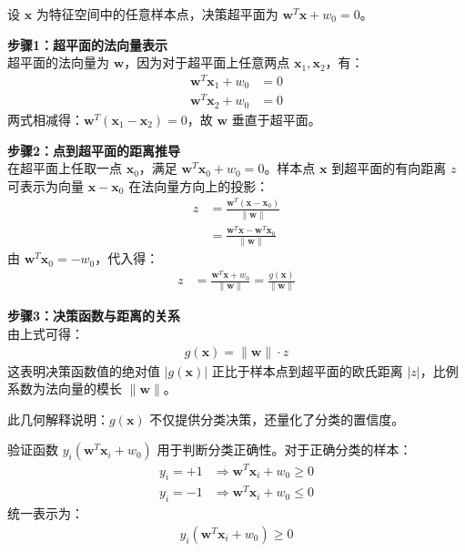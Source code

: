 \begin{derivationnote}[决策函数几何意义的详细证明]
设 $\boldsymbol{x}$ 为特征空间中的任意样本点，决策超平面为 $\boldsymbol{w}^T \boldsymbol{x} + w_0 = 0$。

\textbf{步骤1：超平面的法向量表示}\\
超平面的法向量为 $\boldsymbol{w}$，因为对于超平面上任意两点 $\boldsymbol{x}_1, \boldsymbol{x}_2$，有：
\begin{align}
\boldsymbol{w}^T \boldsymbol{x}_1 + w_0 &= 0 \\
\boldsymbol{w}^T \boldsymbol{x}_2 + w_0 &= 0
\end{align}
两式相减得：$\boldsymbol{w}^T (\boldsymbol{x}_1 - \boldsymbol{x}_2) = 0$，故 $\boldsymbol{w}$ 垂直于超平面。

\textbf{步骤2：点到超平面的距离推导}\\
在超平面上任取一点 $\boldsymbol{x}_0$，满足 $\boldsymbol{w}^T \boldsymbol{x}_0 + w_0 = 0$。样本点 $\boldsymbol{x}$ 到超平面的有向距离 $z$ 可表示为向量 $\boldsymbol{x} - \boldsymbol{x}_0$ 在法向量方向上的投影：
\begin{align}
z &= \frac{\boldsymbol{w}^T (\boldsymbol{x} - \boldsymbol{x}_0)}{\|\boldsymbol{w}\|} \\
&= \frac{\boldsymbol{w}^T \boldsymbol{x} - \boldsymbol{w}^T \boldsymbol{x}_0}{\|\boldsymbol{w}\|}
\end{align}
由 $\boldsymbol{w}^T \boldsymbol{x}_0 = -w_0$，代入得：
\begin{align}
z &= \frac{\boldsymbol{w}^T \boldsymbol{x} + w_0}{\|\boldsymbol{w}\|} = \frac{g(\boldsymbol{x})}{\|\boldsymbol{w}\|}
\end{align}

\textbf{步骤3：决策函数与距离的关系}\\
由上式可得：
\begin{align}
g(\boldsymbol{x}) = \|\boldsymbol{w}\| \cdot z
\end{align}
这表明决策函数值的绝对值 $\left|g(\boldsymbol{x})\right|$ 正比于样本点到超平面的欧氏距离 $\left|z\right|$，比例系数为法向量的模长 $\|\boldsymbol{w}\|$。

此几何解释说明：$g(\boldsymbol{x})$ 不仅提供分类决策，还量化了分类的置信度。
\end{derivationnote}

验证函数 $y_i(\boldsymbol{w}^T \boldsymbol{x}_i + w_0)$ 用于判断分类正确性。对于正确分类的样本：
\begin{align}
y_i = +1 &\Rightarrow \boldsymbol{w}^T \boldsymbol{x}_i + w_0 \geq 0 \\
y_i = -1 &\Rightarrow \boldsymbol{w}^T \boldsymbol{x}_i + w_0 \leq 0
\end{align}
统一表示为：
\begin{align}
y_i(\boldsymbol{w}^T \boldsymbol{x}_i + w_0) \geq 0
\end{align}

